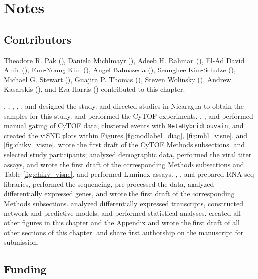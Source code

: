 \section*{Notes}

\subsection*{Contributors}

Theodore R. Pak (), Daniela Michlmayr (), Adeeb H. Rahman (), El-Ad David Amir (), Eun-Young Kim (), Angel Balmaseda (), Seunghee Kim-Schulze (), Michael G. Stewart (), Guajira P. Thomas (), Steven Wolinsky (), Andrew Kasarskis (), and Eva Harris () contributed to this chapter. 

, , , , , and  designed the study.  and  directed studies in Nicaragua to obtain the samples for this study.  and  performed the CyTOF experiments. , , and  performed manual gating of CyTOF data, clustered events with \texttt{MetaHybridLouvain}, and created the viSNE plots within Figures \ref{fig:nodlabel_diag}, \ref{fig:mhl_visne}, and \ref{fig:chikv_visne}.  wrote the first draft of the CyTOF Methods subsections.  and  selected study participants;  analyzed demographic data, performed the viral titer assays, and wrote the first draft of the corresponding Methods subsections and Table \ref{fig:chikv_visne}.  and  performed Luminex assays. , , and  prepared RNA-seq libraries, performed the sequencing, pre-processed the data, analyzed differentially expressed genes, and wrote the first draft of the corresponding Methods subsections.  analyzed differentially expressed transcripts, constructed network and predictive models, and performed statistical analyses.  created all other figures in this chapter and the Appendix and wrote the first draft of all other sections of this chapter.  and  share first authorship on the manuscript for submission.

\subsection*{Funding}

